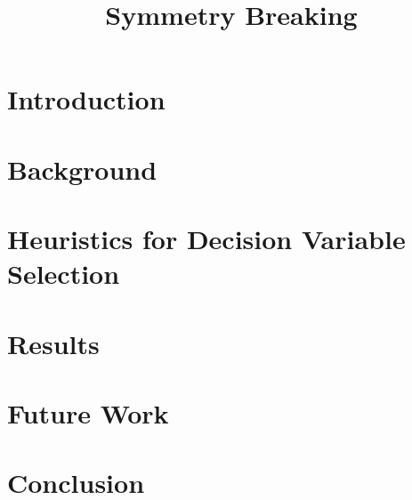 

\title{Symmetry Breaking}


	\maketitle

	\listoftodos

	\begin{abstract}
	\end{abstract}

	\section{Introduction}
		\label{sec:Introduction}
		

	\section{Background}
		\label{sec:Background}
		

	\section{Heuristics for Decision Variable Selection}
		\label{sec:DecisionVars}
		

	\section{Results}
		\label{sec:Results}
		

	\section{Future Work}
		\label{sec:FutureWork}
		
	
	\section{Conclusion}
		\label{sec:Conclusion}
		

	\newpage
	
	

